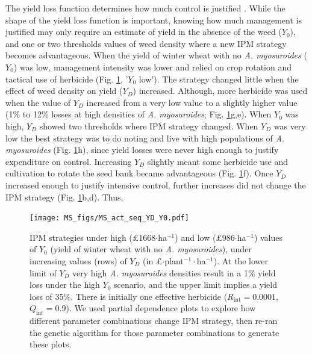 \documentclass[12pt, a4paper]{article}
\begin{document}
The yield loss function determines how much control is justified \citep{Yoko2009}. While the shape of the yield loss function is important, knowing how much management is justified may only require an estimate of yield in the absence of the weed ($Y_0$), and one or two thresholds values of weed density where a new IPM strategy becomes advantageous. When the yield of winter wheat with no \textit{A. myosuroides} ($Y_0$) was low, management intensity was lower and relied on crop rotation and tactical use of herbicide (Fig. \ref{fig:Y0_YD}, '$Y_0$ low'). The strategy changed little when the effect of weed density on yield ($Y_D$) increased. Although, more herbicide was used when the value of $Y_D$ increased from a very low value to a slightly higher value (1\% to 12\% losses at high densities of \textit{A. myosuroides}; Fig. \ref{fig:Y0_YD}g,e). When $Y_0$ was high, $Y_D$ showed two thresholds where IPM strategy changed. When $Y_D$ was very low the best strategy was to do noting and live with high populations of \textit{A. myosuroides} (Fig. \ref{fig:Y0_YD}h), since yield losses were never high enough to justify expenditure on control. Increasing $Y_D$ slightly meant some herbicide use and cultivation to rotate the seed bank became advantageous (Fig. \ref{fig:Y0_YD}f). Once $Y_D$ increased enough to justify intensive control, further increases did not change the IPM strategy (Fig. \ref{fig:Y0_YD}b,d). Thus, 
\begin{figure}
	\centering
	\texttt{[image: MS\_figs/MS\_act\_seq\_YD\_Y0.pdf]}
	\caption{IPM strategies under high (\pounds 1668$\cdot$ha$^{-1}$) and low (\pounds 986$\cdot$ha$^{-1}$) values of $Y_0$ (yield of winter wheat with no \textit{A. myosuroides}), under increasing values (rows) of $Y_D$ (in \pounds$\cdot$plant$^{-1}\cdot$ha$^{-1}$). At the lower limit of $Y_D$ very high \textit{A. myosuroides} densities result in a 1\% yield loss under the high $Y_0$ scenario, and the upper limit implies a yield loss of 35\%. There is initially one effective herbicide ($R_\text{int} = 0.0001$, $Q_\text{int} = 0.9$). We used partial dependence plots to explore how different parameter combinations change IPM strategy, then re-ran the genetic algorithm for those parameter combinations to generate these plots.}
	\label{fig:Y0_YD} 
\end{figure}
\end{document}
